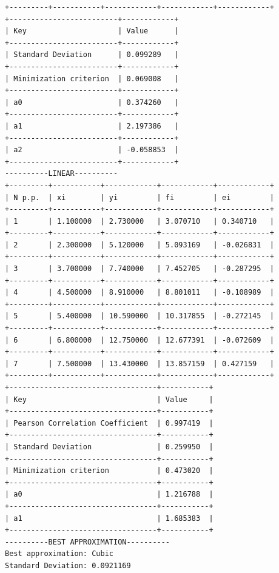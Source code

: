 \documentclass[12pt,one column]{article}
\begin{document}
\begin{verbatim}
+---------+-----------+------------+------------+------------+
+-------------------------+------------+
| Key                     | Value      | 
+-------------------------+------------+
| Standard Deviation      | 0.099289   | 
+-------------------------+------------+
| Minimization criterion  | 0.069008   | 
+-------------------------+------------+
| a0                      | 0.374260   | 
+-------------------------+------------+
| a1                      | 2.197386   | 
+-------------------------+------------+
| a2                      | -0.058853  | 
+-------------------------+------------+
----------LINEAR----------
+---------+-----------+------------+------------+------------+
| N p.p.  | xi        | yi         | fi         | ei         | 
+---------+-----------+------------+------------+------------+
| 1       | 1.100000  | 2.730000   | 3.070710   | 0.340710   | 
+---------+-----------+------------+------------+------------+
| 2       | 2.300000  | 5.120000   | 5.093169   | -0.026831  | 
+---------+-----------+------------+------------+------------+
| 3       | 3.700000  | 7.740000   | 7.452705   | -0.287295  | 
+---------+-----------+------------+------------+------------+
| 4       | 4.500000  | 8.910000   | 8.801011   | -0.108989  | 
+---------+-----------+------------+------------+------------+
| 5       | 5.400000  | 10.590000  | 10.317855  | -0.272145  | 
+---------+-----------+------------+------------+------------+
| 6       | 6.800000  | 12.750000  | 12.677391  | -0.072609  | 
+---------+-----------+------------+------------+------------+
| 7       | 7.500000  | 13.430000  | 13.857159  | 0.427159   | 
+---------+-----------+------------+------------+------------+
+----------------------------------+-----------+
| Key                              | Value     | 
+----------------------------------+-----------+
| Pearson Correlation Coefficient  | 0.997419  | 
+----------------------------------+-----------+
| Standard Deviation               | 0.259950  | 
+----------------------------------+-----------+
| Minimization criterion           | 0.473020  | 
+----------------------------------+-----------+
| a0                               | 1.216788  | 
+----------------------------------+-----------+
| a1                               | 1.685383  | 
+----------------------------------+-----------+
----------BEST APPROXIMATION----------
Best approximation: Cubic
Standard Deviation: 0.0921169
\end{verbatim}
\end{document}

